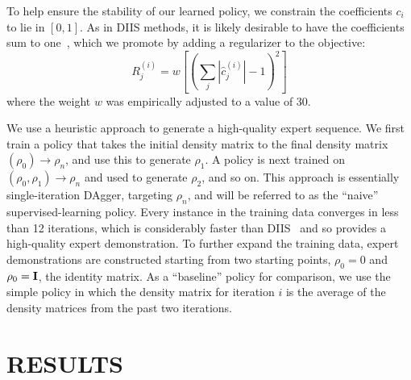 \documentclass[twoside,11pt]{article}
\begin{document}
To help ensure the stability of our learned policy, we constrain the coefficients $c_i$ to lie in $[0, 1]$. As in DIIS methods, it is likely desirable to have the coefficients sum to one~\citep{EDIIS}, which we promote by adding a regularizer to the objective:
\begin{equation}
R^{(i)}_j =  w \left[\left(\sum_j |\hat{c}^{(i)}_j| - 1\right)^2\right]
\end{equation}
where the weight $w$ was empirically adjusted to a value of 30.

We use a heuristic approach to generate a high-quality expert sequence. We first train a policy that takes the initial density matrix to the final density matrix $(\rho_0) \rightarrow \rho_n$, and use this to generate $\rho_1$. A policy is next trained on $(\rho_0, \rho_1) \rightarrow \rho_n$ and used to generate $\rho_2$, and so on. This approach is essentially single-iteration DAgger, targeting $\rho_n$, and will be referred to as the ``naive'' supervised-learning policy. Every instance in the training data converges in less than 12 iterations, which is considerably faster than DIIS~\citep{Pulay1980} and so provides a high-quality expert demonstration. To further expand the training data, expert demonstrations are constructed starting from two starting points, $\rho_0 = 0$ and $\rho_0 = {\bf I}$, the identity matrix. As a ``baseline'' policy for comparison, we use the simple policy in which the density matrix for iteration $i$ is the average of the density matrices from the past two iterations.

\section{RESULTS}
\end{document}
